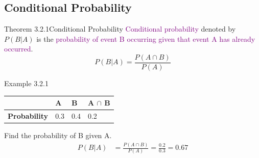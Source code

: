 \documentclass{book}
\begin{document}
\subsection{Conditional Probability}
\begin{thmBox}{Theorem 3.2.1}{Conditional Probability}
    \textcolor{purple}{Conditional probability} denoted by \(P(B|A)\) is the \textcolor{purple}{probability of event B occurring given that event A has already occurred}.
    \[
        P(B|A) = \frac{P(A \cap B)}{P(A)}
    \]
\end{thmBox}
\begin{egBox}{Example 3.2.1}{}
    \begin{center}
        \begin{tabular}{|m{2.5cm}|m{2.5cm}|m{2.5cm}|m{2.5cm}|}
             \hline
                        & \textbf{A} & \textbf{B} & \textbf{A $\cap$ B} \\
                        \hline
                        \textbf{Probability} & 0.3 & 0.4 & 0.2 \\
                        \hline
        \end{tabular}
    \end{center}
    Find the probability of B given A.
    \begin{align*}
        P(B|A) & = \frac{P(A \cap B)}{P(A)} = \frac{0.2}{0.3} = 0.67
    \end{align*}
\end{egBox}
\newpage
\end{document}
